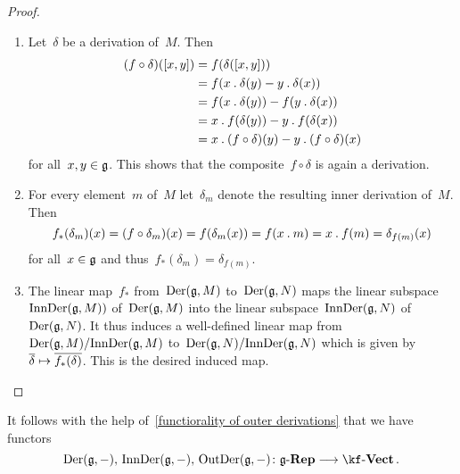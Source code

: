 \begin{proof}
	\leavevmode
	\begin{enumerate}
		\item
			Let~$\delta$ be a derivation of~$M$.
			Then
			\begin{align*}
				(f \circ \delta)([x,y])
				&=
				f( \delta([x,y]) )
				\\
				&=
				f( x \mathbin{.} \delta(y) - y \mathbin{.} \delta(x) )
				\\
				&=
				f( x \mathbin{.} \delta(y) ) - f( y \mathbin{.} \delta(x) )
				\\
				&=
				x \mathbin{.} f( \delta(y) ) - y \mathbin{.} f( \delta(x) )
				\\
				&=
				x \mathbin{.} (f \circ \delta)(y) - y \mathbin{.} (f \circ \delta)(x)
			\end{align*}
			for all~$x, y \in \mathfrak{g}$.
			This shows that the composite~$f \circ \delta$ is again a derivation.
		\item
			For every element~$m$ of~$M$ let~$\delta_m$ denote the resulting inner derivation of~$M$.
			Then
			\[
				f_*(\delta_m)(x)
				=
				(f \circ \delta_m)(x)
				=
				f( \delta_m(x) )
				=
				f( x \mathbin{.} m )
				=
				x \mathbin{.} f(m)
				=
				\delta_{f(m)}(x)
			\]
			for all~$x \in \mathfrak{g}$ and thus~$f_*( \delta_m ) = \delta_{f(m)}$.
		\item
			The linear map~$f_*$ from~$\operatorname{Der}(\mathfrak{g}, M)$ to~$\operatorname{Der}(\mathfrak{g}, N)$ maps the linear subspace~$\operatorname{InnDer}(\mathfrak{g}, M) )$ of~$\operatorname{Der}(\mathfrak{g}, M)$ into the linear subspace~$\operatorname{InnDer}(\mathfrak{g}, N)$ of~$\operatorname{Der}(\mathfrak{g}, N)$.
			It thus induces a well-defined linear map from~$\operatorname{Der}(\mathfrak{g}, M) / {\operatorname{InnDer}(\mathfrak{g}, M)}$ to~$\operatorname{Der}(\mathfrak{g}, N) / {\operatorname{InnDer}(\mathfrak{g}, N)}$ which is given by~$\class{\delta} \mapsto \class{f_*(\delta)}$.
			This is the desired induced map.
		\qedhere
	\end{enumerate}
\end{proof}


\begin{remark}
	It follows with the help of~\cref{functiorality of outer derivations} that we have functors
	\[
		\Der(\glie, \ph),
		\,
		\InnDer(\glie, \ph),
		\,
		\OutDer(\glie, \ph)
		\colon
		\cRep{\glie}
		\to
		\cVect{\kf} \,.
	\]
\end{remark}


